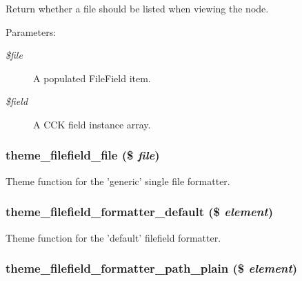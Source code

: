 Return whether a file should be listed when viewing the node.

\begin{Desc}
\item[Parameters:]
\begin{description}
\item[{\em \$file}]A populated FileField item. \item[{\em \$field}]A CCK field instance array. \end{description}
\end{Desc}
\hypertarget{filefield__formatter_8inc_2a9bf3e344a51bd3b44f2cc65bd7078c}{
\subsubsection[{theme\_\-filefield\_\-file}]{\setlength{\rightskip}{0pt plus 5cm}theme\_\-filefield\_\-file (\$ {\em file})}}
\label{filefield__formatter_8inc_2a9bf3e344a51bd3b44f2cc65bd7078c}


Theme function for the 'generic' single file formatter. \hypertarget{filefield__formatter_8inc_b9986ffee43634c7091d4b78e6b3b186}{
\subsubsection[{theme\_\-filefield\_\-formatter\_\-default}]{\setlength{\rightskip}{0pt plus 5cm}theme\_\-filefield\_\-formatter\_\-default (\$ {\em element})}}
\label{filefield__formatter_8inc_b9986ffee43634c7091d4b78e6b3b186}


Theme function for the 'default' filefield formatter. \hypertarget{filefield__formatter_8inc_cbb156ec87a8a950a49e4a83ffd0aadd}{
\subsubsection[{theme\_\-filefield\_\-formatter\_\-path\_\-plain}]{\setlength{\rightskip}{0pt plus 5cm}theme\_\-filefield\_\-formatter\_\-path\_\-plain (\$ {\em element})}}
\label{filefield__formatter_8inc_cbb156ec87a8a950a49e4a83ffd0aadd}



